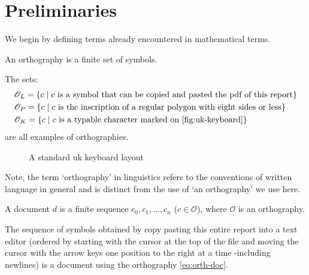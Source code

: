 \section{Preliminaries}
We begin by defining terms already encountered in mathematical terms.

\begin{definition}[Orthography]\label{def:orthography}
  An orthography is a finite set of symbols.
\end{definition}

\begin{example}\label{ex:orthographies}
  The sets:
  \begin{align}
    &\mathscr{O}_L=\{c\mid\text{$c$ is a symbol that can be copied and pasted the pdf of this report}\}\label{eq:orth-doc}\\
    &\mathscr{O}_P=\{c\mid\text{$c$ is the inscription of a regular polygon with eight sides or less}\}\label{eq:orth-shape}\\
    &\mathscr{O}_K=\{c\mid\text{$c$ is a typable character marked on \autoref{fig:uk-keyboard}}\}\label{eq:orth-keyboard}
  \end{align}
  are all examples of orthographies.
\end{example}
\vspace{6pt}

\begin{figure}[ht]
 \centering
 
 \caption{A standard uk keyboard layout}
 \label{fig:uk-keyboard}
\end{figure}

Note, the term `orthography' in linguistics refers to the conventions of written language in general and is distinct from the use of `an orthography' we use here.

\begin{definition}[Document]
  A document $d$ is a finite sequence $c_0,c_1,\dots,c_n$ ($c\in\mathscr{O}$), where $\mathscr{O}$ is an orthography.
\end{definition}

\begin{example}\label{ex:doc-report}
    The sequence of symbols obtained by copy pasting this entire report into a text editor (ordered by starting with the cursor at the top of the file and moving the cursor with the arrow keys one position to the right at a time -including newlines) is a document using the orthography \ref{eq:orth-doc}.
\end{example}
\vspace{6pt}

